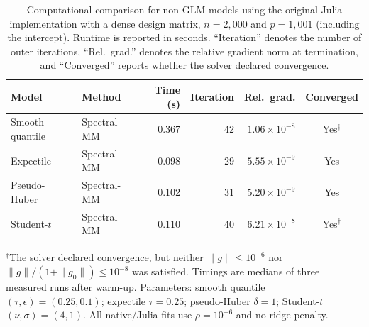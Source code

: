\clearpage

\begin{table}[htbp]
\centering
\small
\setlength{\tabcolsep}{4pt}
\caption{
Computational comparison for non-GLM models using the original Julia implementation with a dense design matrix,
$n=2{,}000$ and $p=1{,}001$ (including the intercept).
Runtime is reported in seconds. ``Iteration\textquotedblright{} denotes the number of outer iterations,
``Rel.\ grad.\textquotedblright{} denotes the relative gradient norm at termination, and
``Converged\textquotedblright{} reports whether the solver declared convergence.}
\label{tab:julia-nonglm-comparison-dense}
\begin{tabular}{llrrrc}
\toprule
Model & Method & Time (s) & Iteration & Rel.\ grad. & Converged \\
\midrule

Smooth quantile
& Spectral-MM & 0.367 & 42 & $1.06\times10^{-8}$ & Yes$^{\dagger}$ \\
\midrule

Expectile
& Spectral-MM & 0.098 & 29 & $5.55\times10^{-9}$ & Yes \\
\midrule

Pseudo-Huber
& Spectral-MM & 0.102 & 31 & $5.20\times10^{-9}$ & Yes \\
\midrule

Student-$t$
& Spectral-MM & 0.110 & 40 & $6.21\times10^{-8}$ & Yes$^{\dagger}$ \\

\bottomrule
\end{tabular}
\par\smallskip
\begin{minipage}{\linewidth}
\footnotesize
$^{\dagger}$The solver declared convergence, but neither $\|g\|\leq 10^{-6}$ nor
$\|g\|/(1+\|g_0\|)\leq 10^{-8}$ was satisfied.
Timings are medians of three measured runs after warm-up.
Parameters: smooth quantile $(\tau,\epsilon)=(0.25,0.1)$; expectile $\tau=0.25$;
pseudo-Huber $\delta=1$; Student-$t$ $(\nu,\sigma)=(4,1)$.
All native/Julia fits use $\rho=10^{-6}$ and no ridge penalty.
\end{minipage}
\end{table}

\clearpage


